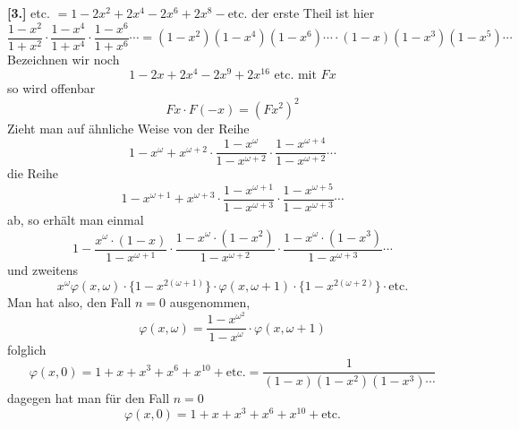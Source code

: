 \documentclass[10pt,a4paper]{article}
\begin{document}
\textbf{[3.]} etc. $= 1 - 2x^2 + 2x^4 - 2x^6 + 2x^8 - \text{etc.}$
%
der erste Theil ist hier
%
\begin{equation*}
\frac{1 - x^2}{1 + x^2} \cdot \frac{1 - x^4}{1 + x^4} \cdot \frac{1 - x^6}{1 + x^6} \cdots
= (1 - x^2)(1 - x^4)(1 - x^6) \cdots \cdot (1 - x)(1 - x^3)(1 - x^5) \cdots
\end{equation*}
%
Bezeichnen wir noch
%
\begin{equation*}
1 - 2x + 2x^4 - 2x^9 + 2x^{16} \text{ etc. mit } Fx
\end{equation*}
%
so wird offenbar
%
\begin{equation*}
Fx \cdot F(-x) = (Fx^2)^2
\end{equation*}
%
Zieht man auf ähnliche Weise von der Reihe
%
\begin{equation*}
1 - x^{\omega} + x^{\omega+2} \cdot \frac{1 - x^{\omega}}{1 - x^{\omega+2}} \cdot \frac{1 - x^{\omega+4}}{1 - x^{\omega+2}} \cdots
\end{equation*}
%
die Reihe
%
\begin{equation*}
1 - x^{\omega+1} + x^{\omega+3} \cdot \frac{1 - x^{\omega+1}}{1 - x^{\omega+3}} \cdot \frac{1 - x^{\omega+5}}{1 - x^{\omega+3}} \cdots
\end{equation*}
%
ab, so erhält man einmal
%
\begin{equation*}
1 - \frac{x^{\omega} \cdot (1 - x)}{1 - x^{\omega+1}} \cdot \frac{1 - x^{\omega} \cdot (1 - x^2)}{1 - x^{\omega+2}} \cdot \frac{1 - x^{\omega} \cdot (1 - x^3)}{1 - x^{\omega+3}} \cdots
\end{equation*}
%
und zweitens
%
\begin{equation*}
x^{\omega}\varphi(x, \omega) \cdot \bigl\{1 - x^{2(\omega+1)}\bigr\} \cdot \varphi(x, \omega+1) \cdot \bigl\{1 - x^{2(\omega+2)}\bigr\} \cdot \text{etc.}
\end{equation*}
%
Man hat also, den Fall $n = 0$ ausgenommen,
%
\begin{equation*}
\varphi(x, \omega) = \frac{1 - x^{\omega^2}}{1 - x^{\omega}} \cdot \varphi(x, \omega+1)
\end{equation*}
%
folglich
%
\begin{equation*}
\varphi(x, 0) = 1 + x + x^3 + x^6 + x^{10} + \text{etc.} = \frac{1}{(1 - x)(1 - x^2)(1 - x^3) \cdots}
\end{equation*}
%
dagegen hat man für den Fall $n = 0$
%
\begin{equation*}
\varphi(x, 0) = 1 + x + x^3 + x^6 + x^{10} + \text{etc.}
\end{equation*}
\end{document}
